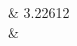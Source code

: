 \documentclass[10pt,a4paper]{article} %
\begin{document}
\begin{center}
\begin{tabular}
                                                                                                                                                                                                                                                                                                                                                                                                                                                                                                                                                                                                                        &
                                                                                                                                                                                                                                                                                                                                                                                                                                                                                                                                                                                                                        3.22612
                                                                                                                                                                                                                                                                                                                                                                                                                                                                                                                                                                                                                        \\
                                                                                                                                                                                                                                                                                                                                                                                                                                                                                                                                                                                                                        &

\end{tabular}
\end{center}
\end{document}
